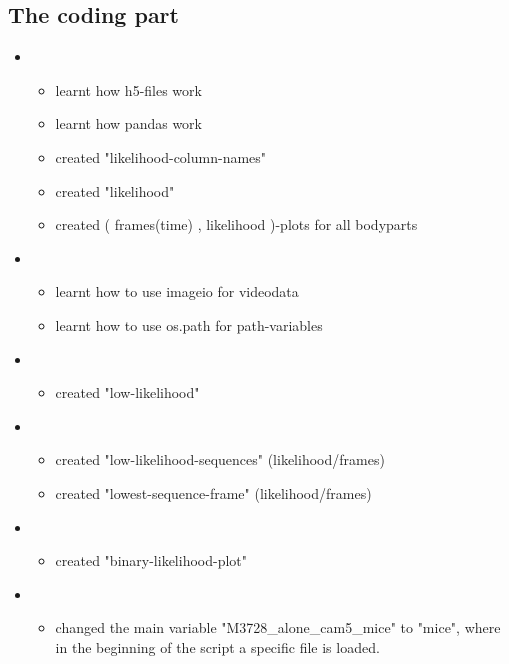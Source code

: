 \documentclass{article}
\begin{document}
\subsection{The coding part}

\begin{itemize}
    \item \begin{itemize}
        \item learnt how h5-files work
        \item learnt how pandas work
        \item created "likelihood-column-names"
        \item created "likelihood" 
        \item created ( frames(time) , likelihood )-plots for all bodyparts
    \end{itemize}
    
    \item \begin{itemize}
        \item learnt how to use imageio for videodata
        \item learnt how to use os.path for path-variables
    \end{itemize}
    
    \item \begin{itemize}
        \item created "low-likelihood"
    \end{itemize}
    
    \item \begin{itemize}
        \item created "low-likelihood-sequences" (likelihood/frames)
        \item created "lowest-sequence-frame" (likelihood/frames)
    \end{itemize}
    
    \item \begin{itemize}
        \item created "binary-likelihood-plot"
    \end{itemize}
    
    \item \begin{itemize}
        \item changed the main variable "M3728\_alone\_cam5\_mice" to "mice", where in the beginning of the script a specific file is loaded.
    \end{itemize}
    

\end{itemize}
\end{document}
